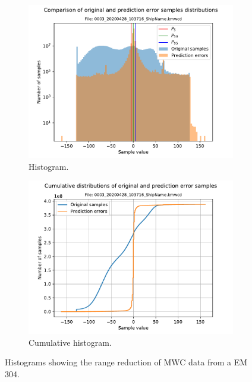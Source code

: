 \begin{figure}[h!]
	\centering
	\begin{subfigure}{0.5\textwidth}
		\centering
		\includegraphics[width=\linewidth]{images/0003_20200428_103716_ShipName.kmwcd_hist.pdf}
		\caption{Histogram.}
		\label{fig:hist_003_kmall}
	\end{subfigure}%
	\begin{subfigure}{0.5\textwidth}
		\centering
		\includegraphics[width=\linewidth]{images/0003_20200428_103716_ShipName.kmwcd_hist_cum.pdf}
		\caption{Cumulative histogram.}
		\label{fig:cum_hist_003_kmall}
	\end{subfigure}
	\caption{Histograms showing the range reduction of MWC data from a EM 304.}
	\label{fig:0003_kmall}
\end{figure}

